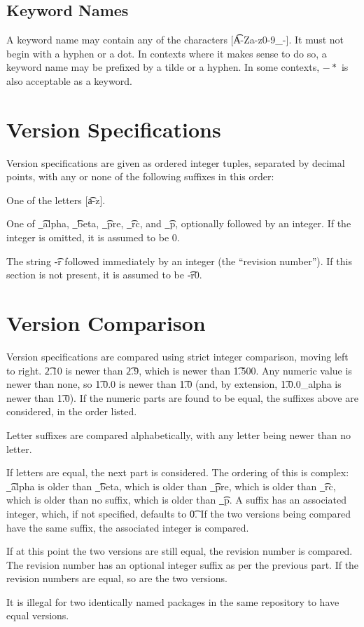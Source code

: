 \subsection{Keyword Names}
\label{keyword-names}
A keyword name may contain any of the characters [\t{A-Za-z0-9\_-}]. It must not begin with a
hyphen or a dot. In contexts where it makes sense to do so, a keyword name may be prefixed by
a tilde or a hyphen. In some contexts, $-*$ is also acceptable as a keyword.

\section{Version Specifications}
Version specifications are given as ordered integer tuples, separated by decimal points, with any or
none of the following suffixes in this order:
\begin{bulletlist}
\item One of the letters [\t{a-z}].
\item One of \t{\_alpha}, \t{\_beta}, \t{\_pre}, \t{\_rc}, and \t{\_p}, optionally followed by an
    integer. If the integer is omitted, it is assumed to be 0.
\item The string \t{-r} followed immediately by an integer (the ``revision number''). If this section
    is not present, it is assumed to be \t{-r0}.
\end{bulletlist}


\section{Version Comparison}

Version specifications are compared using strict integer comparison, moving left to right. \t{2.10}
is newer than \t{2.9}, which is newer than \t{1.500}. Any numeric value is newer than none, so
\t{1.0.0} is newer than \t{1.0} (and, by extension, \t{1.0.0\_alpha} is newer than \t{1.0}).
If the numeric parts are found to be equal, the suffixes above are considered, in the order listed.

Letter suffixes are compared alphabetically, with any letter being newer than no letter.

If letters are equal, the next part is considered. The ordering of this is complex: \t{\_alpha} is
older than \t{\_beta}, which is older than \t{\_pre}, which is older than \t{\_rc}, which is older
than no suffix, which is older than \t{\_p}. A suffix has an associated integer, which, if not
specified, defaults to \t{0}. If the two versions being compared have the same suffix, the
associated integer is compared.

If at this point the two versions are still equal, the revision number is compared. The revision
number has an optional integer suffix as per the previous part. If the revision numbers are equal,
so are the two versions.

It is illegal for two identically named packages in the same repository to have equal versions.


